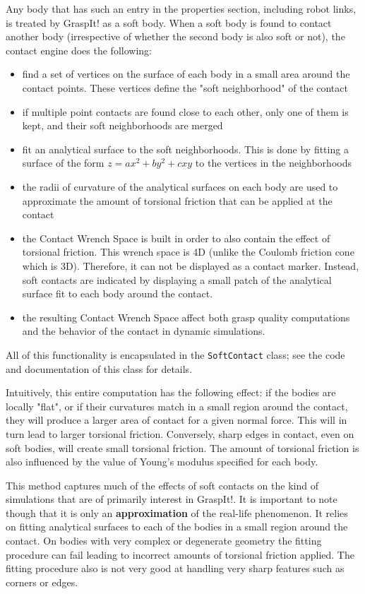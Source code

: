 Any body that has such an entry in the properties section, including
robot links, is treated by GraspIt! as a soft body. When a soft body
is found to contact another body (irrespective of whether the second
body is also soft or not), the contact engine does the following:
\begin{itemize}
\item find a set of vertices on the surface of each body in a small
  area around the contact points. These vertices define the "soft
  neighborhood" of the contact
\item if multiple point contacts are found close to each other, only
  one of them is kept, and their soft neighborhoods are merged
\item fit an analytical surface to the soft neighborhoods. This is
  done by fitting a surface of the form $z=ax^2+by^2+cxy$ to
  the vertices in the neighborhoods
\item the radii of curvature of the analytical surfaces on each body
  are used to approximate the amount of torsional friction that can be
  applied at the contact
\item the Contact Wrench Space is built in order to also contain the
  effect of torsional friction. This wrench space is 4D (unlike the
  Coulomb friction cone which is 3D). Therefore, it can not be
  displayed as a contact marker. Instead, soft contacts are indicated
  by displaying a small patch of the analytical surface fit to each
  body around the contact.
\item the resulting Contact Wrench Space affect both grasp quality
  computations and the behavior of the contact in dynamic simulations.
\end{itemize}

All of this functionality is encapsulated in the \texttt{SoftContact}
class; see the code and documentation of this class for details.

Intuitively, this entire computation has the following effect: if the
bodies are locally "flat", or if their curvatures match in a small
region around the contact, they will produce a larger area of contact
for a given normal force. This will in turn lead to larger torsional
friction. Conversely, sharp edges in contact, even on soft bodies,
will create small torsional friction. The amount of torsional friction
is also influenced by the value of Young's modulus specified for each
body.

This method captures much of the effects of soft contacts on the kind
of simulations that are of primarily interest in GraspIt!. It is
important to note though that it is only an \textbf{approximation} of the
real-life phenomenon. It relies on fitting analytical surfaces to each
of the bodies in a small region around the contact. On bodies with
very complex or degenerate geometry the fitting procedure can fail
leading to incorrect amounts of torsional friction applied. The
fitting procedure also is not very good at handling very sharp
features such as corners or edges.


